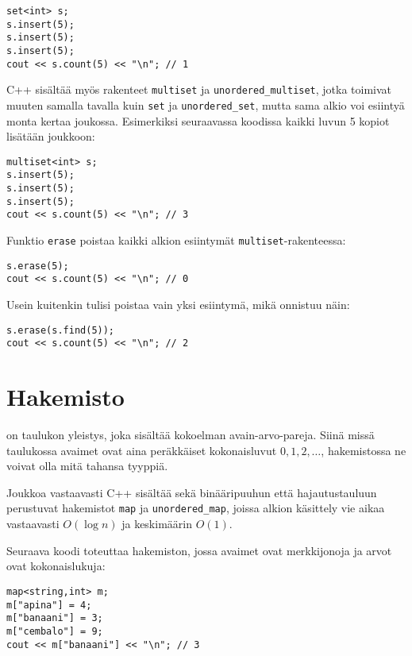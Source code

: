 \begin{lstlisting}
set<int> s;
s.insert(5);
s.insert(5);
s.insert(5);
cout << s.count(5) << "\n"; // 1
\end{lstlisting}


C++ sisältää myös rakenteet
\texttt{multiset} ja \texttt{unordered\_multiset},
jotka toimivat muuten samalla tavalla kuin \texttt{set}
ja \texttt{unordered\_set},
mutta sama alkio voi esiintyä
monta kertaa joukossa.
Esimerkiksi seuraavassa koodissa
kaikki luvun 5 kopiot lisätään joukkoon:

\begin{lstlisting}
multiset<int> s;
s.insert(5);
s.insert(5);
s.insert(5);
cout << s.count(5) << "\n"; // 3
\end{lstlisting}

Funktio \texttt{erase} poistaa
kaikki alkion esiintymät
\texttt{multiset}-rakenteessa:
\begin{lstlisting}
s.erase(5);
cout << s.count(5) << "\n"; // 0
\end{lstlisting}
Usein kuitenkin tulisi poistaa
vain yksi esiintymä,
mikä onnistuu näin:
\begin{lstlisting}
s.erase(s.find(5));
cout << s.count(5) << "\n"; // 2
\end{lstlisting}

\section{Hakemisto}


 on taulukon yleistys,
joka sisältää kokoelman avain-arvo-pareja.
Siinä missä taulukossa avaimet ovat aina peräkkäiset
kokonaisluvut $0,1,2,\ldots$,
hakemistossa ne voivat
olla mitä tahansa tyyppiä.

Joukkoa vastaavasti C++ sisältää sekä
binääripuuhun että hajautustauluun perustuvat
hakemistot \texttt{map} ja \texttt{unordered\_map},
joissa alkion käsittely vie aikaa vastaavasti
$O(\log n)$ ja keskimäärin $O(1)$.

Seuraava koodi toteuttaa hakemiston,
jossa avaimet ovat merkkijonoja ja
arvot ovat kokonaislukuja:

\begin{lstlisting}
map<string,int> m;
m["apina"] = 4;
m["banaani"] = 3;
m["cembalo"] = 9;
cout << m["banaani"] << "\n"; // 3
\end{lstlisting}

